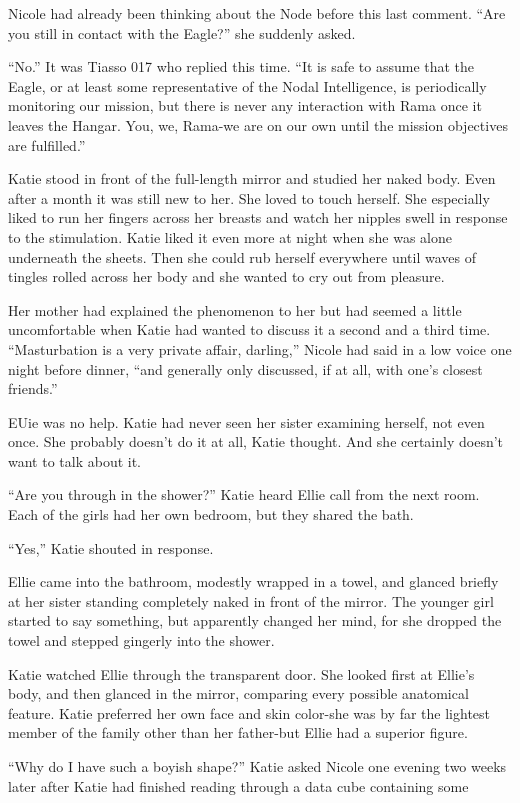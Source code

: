 \documentclass[]{article}
\begin{document}
{Nicole had already been thinking about the Node before this last comment. “Are you still in contact with the Eagle?” she suddenly asked.

“No.” It was Tiasso 017 who replied this time. “It is safe to assume that the Eagle, or at least some representative of the Nodal Intelligence, is periodically monitoring our mission, but there is never any interaction with Rama once it leaves the Hangar. You, we, Rama-we are on our own until the mission objectives are fulfilled.”

Katie stood in front of the full-length mirror and studied her naked body. Even after a month it was still new to her. She loved to touch herself. She especially liked to run her fingers across her breasts and watch her nipples swell in response to the stimulation. Katie liked it even more at night when she was alone underneath the sheets. Then she could rub herself everywhere until waves of tingles rolled across her body and she wanted to cry out from pleasure.

Her mother had explained the phenomenon to her but had seemed a little uncomfortable when Katie had wanted to discuss it a second and a third time. “Masturbation is a very private affair, darling,” Nicole had said in a low voice one night before dinner, “and generally only discussed, if at all, with one’s closest friends.”

EUie was no help. Katie had never seen her sister examining herself, not even once. She probably doesn’t do it at all, Katie thought. And she certainly doesn’t want to talk about it.

“Are you through in the shower?” Katie heard Ellie call from the next room. Each of the girls had her own bedroom, but they shared the bath.

“Yes,” Katie shouted in response.

Ellie came into the bathroom, modestly wrapped in a towel, and glanced briefly at her sister standing completely naked in front of the mirror. The younger girl started to say something, but apparently changed her mind, for she dropped the towel and stepped gingerly into the shower.

Katie watched Ellie through the transparent door. She looked first at Ellie’s body, and then glanced in the mirror, comparing every possible anatomical feature. Katie preferred her own face and skin color-she was by far the lightest member of the family other than her father-but Ellie had a superior figure.

“Why do I have such a boyish shape?” Katie asked Nicole one evening two weeks later after Katie had finished reading through a data cube containing some

}
\end{document}
